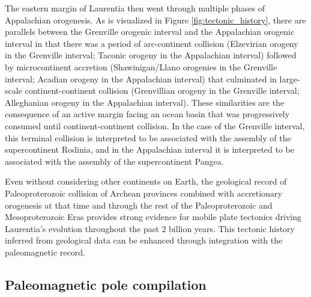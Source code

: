 \documentclass[twocolumn, switch]{article} %
\begin{document}
The eastern margin of Laurentia then went through multiple phases of Appalachian orogenesis. As is visualized in Figure \ref{fig:tectonic_history}, there are parallels between the Grenville orogenic interval and the Appalachian orogenic interval in that there was a period of arc-continent collision (Elzevirian orogeny in the Grenville interval; Taconic orogeny in the Appalachian interval) followed by microcontinent accretion (Shawinigan/Llano orogenies in the Grenville interval; Acadian orogeny in the Appalachian interval) that culminated in large-scale continent-continent collision (Grenvillian orogeny in the Grenville interval; Alleghanian orogeny in the Appalachian interval). These similarities are the consequence of an active margin facing an ocean basin that was progressively consumed until continent-continent collision. In the case of the Grenville interval, this terminal collision is interpreted to be associated with the assembly of the supercontinent Rodinia, and in the Appalachian interval it is interpreted to be associated with the assembly of the supercontinent Pangea.

Even without considering other continents on Earth, the geological record of Paleoproterozoic collision of Archean provinces combined with accretionary orogenesis at that time and through the rest of the Paleoproterozoic and Mesoproterozoic Eras provides strong evidence for mobile plate tectonics driving Laurentia's evolution throughout the past 2 billion years. This tectonic history inferred from geological data can be enhanced through integration with the paleomagnetic record.

\subsection{Paleomagnetic pole compilation}
\end{document}

